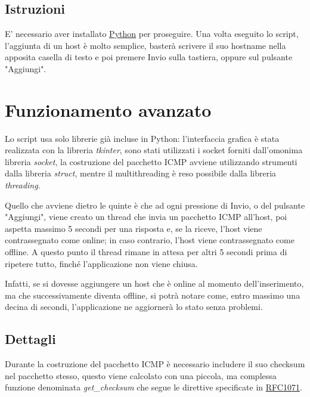 \documentclass[a4paper]{report}
\begin{document}
\subsection{Istruzioni}
E' necessario aver installato \href{https://www.python.org/}{Python} per proseguire. Una volta eseguito lo script, l'aggiunta di un host è molto semplice, basterà scrivere il suo hostname nella apposita casella di testo e poi premere Invio sulla tastiera, oppure sul pulsante "Aggiungi".

\newpage
\section{Funzionamento avanzato}
Lo script usa solo librerie già incluse in Python: l'interfaccia grafica è stata realizzata con la libreria \textit{tkinter}, sono stati utilizzati i socket forniti dall'omonima libreria \textit{socket}, la costruzione del pacchetto ICMP avviene utilizzando strumenti dalla libreria \textit{struct}, mentre il multithreading è reso possibile dalla libreria \textit{threading}.

Quello che avviene dietro le quinte è che ad ogni pressione di Invio, o del pulsante "Aggiungi", viene creato un thread che invia un pacchetto ICMP all'host, poi aspetta massimo 5 secondi per una risposta e, se la riceve, l'host viene contrassegnato come online; in caso contrario, l'host viene contrassegnato come offline. A questo punto il thread rimane in attesa per altri 5 secondi prima di ripetere tutto, finché l'applicazione non viene chiusa.

Infatti, se si dovesse aggiungere un host che è online al momento dell'inserimento, ma che successivamente diventa offline, si potrà notare come, entro massimo una decina di secondi, l'applicazione ne aggiornerà lo stato senza problemi.

\subsection{Dettagli}
Durante la costruzione del pacchetto ICMP è necessario includere il suo checksum nel pacchetto stesso, questo viene calcolato con una piccola, ma complessa funzione denominata \textit{get\_checksum} che segue le direttive specificate in \href{https://datatracker.ietf.org/doc/html/rfc1071}{RFC1071}.
\end{document}

